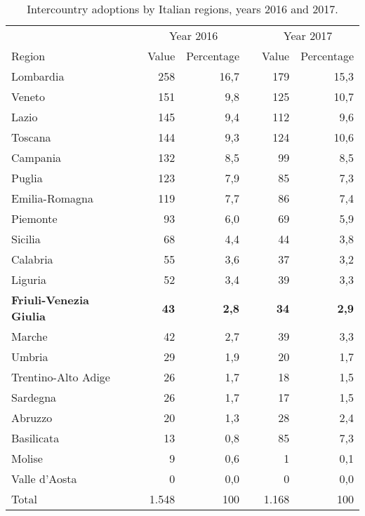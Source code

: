 \begin{table}[H]
   \centering
   \begin{tabular}{l c r r c r r}
      & & \multicolumn{2}{c}{Year 2016} & & \multicolumn{2}{c}{Year 2017}\\
      \cline{3-4} \cline{6-7}
      Region & & Value & Percentage & & Value & Percentage\\
      \hline
      Lombardia & & 258 & 16,7 & & 179 & 15,3\\
      Veneto & & 151 & 9,8 & & 125 & 10,7\\
      Lazio & & 145 & 9,4 & & 112 & 9,6\\
      Toscana & & 144 & 9,3 & & 124 & 10,6\\
      Campania & & 132 & 8,5 & & 99 & 8,5\\
      Puglia & & 123 & 7,9 & & 85 & 7,3\\
      Emilia-Romagna & & 119 & 7,7 & & 86 & 7,4\\
      Piemonte & & 93 & 6,0 & & 69 & 5,9\\
      Sicilia & & 68 & 4,4 & & 44 & 3,8\\
      Calabria & & 55 & 3,6 & & 37 & 3,2\\
      Liguria & & 52 & 3,4 & & 39 & 3,3\\
      \textcolor{BrickRed}{\textbf{Friuli-Venezia Giulia}} & & \textcolor{BrickRed}{\textbf{43}} & \textcolor{BrickRed}{\textbf{2,8}} & & \textcolor{BrickRed}{\textbf{34}} & \textcolor{BrickRed}{\textbf{2,9}}\\
      Marche & & 42 & 2,7 & & 39 & 3,3\\
      Umbria & & 29 & 1,9 & & 20 & 1,7\\
      Trentino-Alto Adige & & 26 & 1,7 & & 18 & 1,5\\
      Sardegna & & 26 & 1,7 & & 17 &1,5 \\
      Abruzzo & & 20 & 1,3 & & 28 & 2,4\\
      Basilicata & & 13 & 0,8 & & 85 & 7,3\\
      Molise & & 9 & 0,6 & & 1 & 0,1\\
      Valle d'Aosta & & 0 & 0,0 & & 0 & 0,0\\
      \hline
      Total & & 1.548 & 100 & & 1.168 & 100\\
   \end{tabular}
   \caption{Intercountry adoptions by Italian regions, years 2016 and 2017.}
    \label{tab:italianregions}
\end{table}


